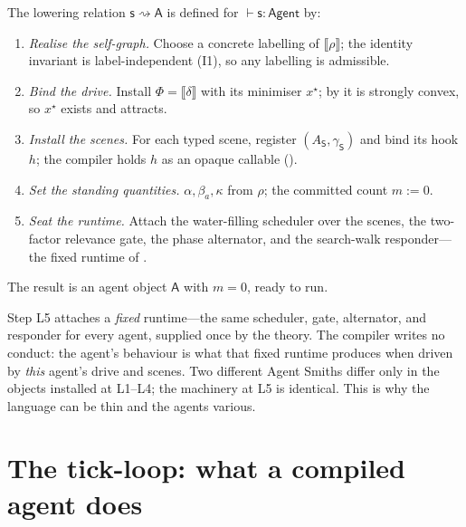 \documentclass[11pt,twocolumn,a4paper]{article}
\newcommand{\Agent}{\mathsf{A}}
\newcommand{\floorc}{\beta}
\newcommand{\drive}{\Phi}
\newcommand{\Purp}{x^{\star}}
\newcommand{\att}{\alpha}
\newcommand{\Scene}{\mathsf{S}}
\newcommand{\spec}{\mathsf{s}}         %
\newcommand{\coh}{\kappa}              %
\newcommand{\judge}{\vdash}
\newcommand{\lowers}{\rightsquigarrow} %
\begin{document}
\begin{definition}[Lowering]
\label{def:lowering}
The lowering relation $\spec\lowers\Agent$ is defined for
$\judge\spec:\mathsf{Agent}$ by:
\begin{enumerate}[label=\textup{L\arabic*.},leftmargin=2.6em]
\item \emph{Realise the self-graph.} Choose a concrete labelling of
$\llbracket\rho\rrbracket$; the identity invariant is label-independent (I1),
so any labelling is admissible.
\item \emph{Bind the drive.} Install $\drive=\llbracket\delta\rrbracket$ with
its minimiser $\Purp$; by  it is strongly convex, so $\Purp$
exists and attracts.
\item \emph{Install the scenes.} For each typed scene, register
$(A_\Scene,\gamma_\Scene)$ and bind its hook $h$; the compiler holds $h$ as an
opaque callable ().
\item \emph{Set the standing quantities.} $\att,\floorc_a,\coh$ from $\rho$;
the committed count $m:=0$.
\item \emph{Seat the runtime.} Attach the water-filling scheduler over the
scenes, the two-factor relevance gate, the phase alternator, and the
search-walk responder---the fixed runtime of .
\end{enumerate}
The result is an agent object $\Agent$ with $m=0$, ready to run.
\end{definition}

\begin{remark}
\label{rem:installs}
Step L5 attaches a \emph{fixed} runtime---the same scheduler, gate,
alternator, and responder for every agent, supplied once by the theory. The
compiler writes no conduct: the agent's behaviour is what that fixed runtime
produces when driven by \emph{this} agent's drive and scenes. Two different
Agent Smiths differ only in the objects installed at L1--L4; the machinery at
L5 is identical. This is why the language can be thin and the agents various.
\end{remark}

\section{The tick-loop: what a compiled agent does}
\label{sec:tickloop}
\end{document}

